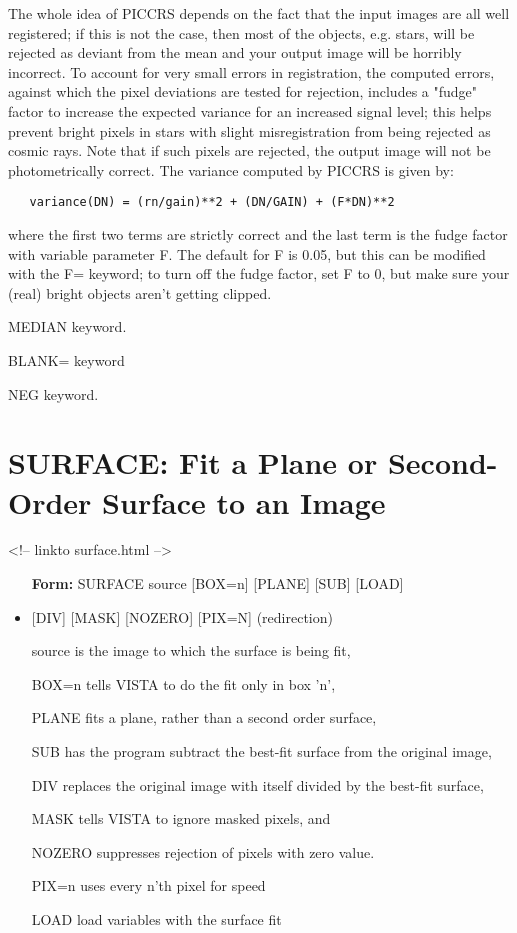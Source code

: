 The whole idea of PICCRS depends on the fact that the input images are all
well registered; if this is not the case, then most of the objects,
e.g. stars, will be rejected as deviant from the mean and your output image
will be horribly incorrect. To account for very small errors in
registration, the computed errors, against which the pixel deviations are
tested for rejection, includes a "fudge" factor to increase the expected
variance for an increased signal level; this helps prevent bright pixels in
stars with slight misregistration from being rejected as cosmic rays. Note
that if such pixels are rejected, the output image will not be
photometrically correct. The variance computed by PICCRS is given by:
\begin{verbatim}
   variance(DN) = (rn/gain)**2 + (DN/GAIN) + (F*DN)**2
\end{verbatim}
where the first two terms are strictly correct and the last term is the
fudge factor with variable parameter F. The default for F is 0.05, but this
can be modified with the F= keyword; to turn off the fudge factor, set F to
0, but make sure your (real) bright objects aren't getting clipped.

 MEDIAN keyword.

 BLANK= keyword

 NEG keyword.

\section{SURFACE: Fit a Plane or Second-Order Surface to an Image}
\begin{rawhtml}
<!-- linkto surface.html -->
\end{rawhtml}

\begin{itemize}
  \item[\textbf{Form: }SURFACE source {[BOX=n]} {[PLANE]} {[SUB]} 
       {[LOAD]}\hfill]{}
  \item{{[DIV]} {[MASK]} {[NOZERO]} {[PIX=N]} (redirection)}
  \item[source]{is the image to which the surface is being fit,}
  \item[BOX=n]{tells VISTA to do the fit only in box 'n',}
  \item[PLANE]{fits a plane, rather than a second order surface,}
  \item[SUB]{has the program subtract the best-fit surface
       from the original image,}
  \item[DIV]{replaces the original image with itself divided by the 
       best-fit surface,}
  \item[MASK]{tells VISTA to ignore masked pixels, and}
  \item[NOZERO]{suppresses rejection of pixels with zero value.}
  \item[PIX=n]{uses every n'th pixel for speed}
  \item[LOAD]{load variables with the surface fit}
\end{itemize}

